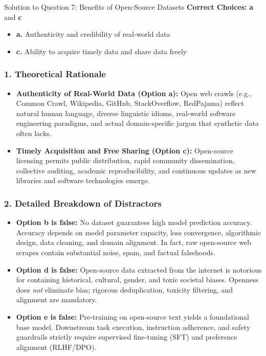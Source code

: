 \documentclass[11pt,a4paper]{article}
\begin{document}
\begin{solutionbox}{Solution to Question 7: Benefits of Open-Source Datasets}
\textbf{Correct Choices:} \textbf{a} and \textbf{c}
\begin{itemize}[leftmargin=1.5em]
    \item \textbf{a.} Authenticity and credibility of real-world data
    \item \textbf{c.} Ability to acquire timely data and share data freely
\end{itemize}

\subsubsection*{1. Theoretical Rationale}
\begin{itemize}[leftmargin=1.5em]
    \item \textbf{Authenticity of Real-World Data (Option a):} Open web crawls (e.g., Common Crawl, Wikipedia, GitHub, StackOverflow, RedPajama) reflect natural human language, diverse linguistic idioms, real-world software engineering paradigms, and actual domain-specific jargon that synthetic data often lacks.
    \item \textbf{Timely Acquisition and Free Sharing (Option c):} Open-source licensing permits public distribution, rapid community dissemination, collective auditing, academic reproducibility, and continuous updates as new libraries and software technologies emerge.
\end{itemize}

\subsubsection*{2. Detailed Breakdown of Distractors}
\begin{itemize}[leftmargin=1.5em]
    \item \textbf{Option b is false:} No dataset guarantees high model prediction accuracy. Accuracy depends on model parameter capacity, loss convergence, algorithmic design, data cleaning, and domain alignment. In fact, raw open-source web scrapes contain substantial noise, spam, and factual falsehoods.
    \item \textbf{Option d is false:} Open-source data extracted from the internet is notorious for containing historical, cultural, gender, and toxic societal biases. Openness does \emph{not} eliminate bias; rigorous deduplication, toxicity filtering, and alignment are mandatory.
    \item \textbf{Option e is false:} Pre-training on open-source text yields a foundational base model. Downstream task execution, instruction adherence, and safety guardrails strictly require supervised fine-tuning (SFT) and preference alignment (RLHF/DPO).
\end{itemize}
\end{solutionbox}
\end{document}
